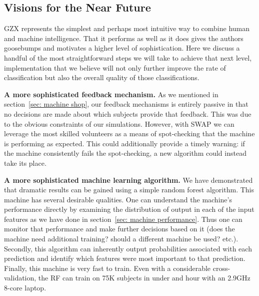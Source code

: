 \documentclass[twocolumn]{aastex6}
\begin{document}
\subsection{Visions for the Near Future}

GZX represents the simplest and perhaps most intuitive way to combine human
and machine intelligence. That it performs as well as it does gives the authors goosebumps
and motivates a higher level of sophistication. Here we discuss a handful of the most 
straightforward steps we will take to achieve that next level, implementation
that we believe will not only further improve the rate of classification but also 
the overall quality of those classifications. 

\textbf{A more sophisticated feedback mechanism.}
As we mentioned in section~\ref{sec: machine shop}, our feedback mechanisms is 
entirely passive in that no decisions are made about which subjects provide that 
feedback. This was due to the obvious constraints of our simulations. 
However, with SWAP we can leverage the most skilled volunteers as a means 
of spot-checking that the machine is performing as expected. This could additionally
provide a timely warning: if the machine consistently fails the spot-checking, a new
algorithm could instead take its place. 

\textbf{A more sophisticated machine learning algorithm.} 
We have demonstrated that dramatic results can be gained using a simple random 
forest algorithm. This machine has several desirable qualities. 
One can understand the machine's performance
directly by examining the distribution of output in each of the input features as we 
have done in section~\ref{sec: machine performance}. Thus one can monitor that 
performance and make further decisions based on it (does the machine need additional
training? should a different machine be used? etc.). Secondly, this algorithm can 
inherently output probabilities associated with each prediction and identify which
features were most important to that prediction. Finally, this machine is very fast
to train. Even with a considerable cross-validation, the RF can train on 75K subjects
in under and hour with an 2.9GHz 8-core laptop. 
\end{document}
